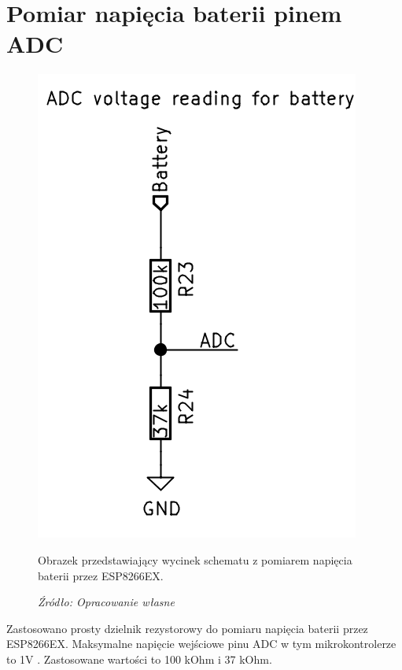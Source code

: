 \documentclass[12pt,a4paper,oneside]{memoir}
\begin{document}
\section{Pomiar napięcia baterii pinem ADC}
\begin{figure}[!h]
	\centering
	\includegraphics[scale=0.3]{images/sch/sch-08.png}
	{\tytulyrozdzialow \footnotesize \caption[Schemat - sekcja ADC] {Obrazek przedstawiający wycinek schematu z pomiarem napięcia baterii przez ESP8266EX.}}
	\caption*{\textit{Źródło: Opracowanie własne}}
\end{figure}
\par Zastosowano prosty dzielnik rezystorowy do pomiaru napięcia baterii przez ESP8266EX. Maksymalne napięcie wejściowe pinu ADC w tym mikrokontrolerze to 1V \cite{esp8266datasheet}. Zastosowane wartości to 100 kOhm i 37 kOhm.
\end{document}
